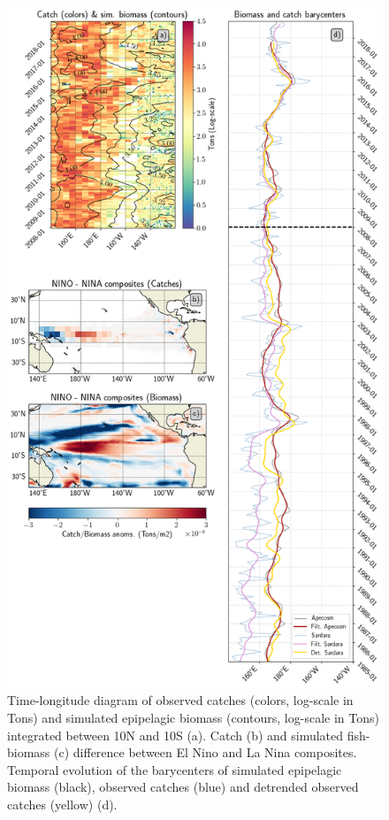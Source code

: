 \begin{figure}[h!tp]
	\centering
	\includegraphics[scale=0.35]{figs/plot_validation_apecosm.png}
	\caption{Time-longitude diagram of observed catches (colors, log-scale in Tons) and simulated epipelagic biomass (contours, log-scale in Tons) integrated between 10N and 10S (a). Catch (b) and simulated fish-biomass (c) difference between El Nino and La Nina composites. Temporal evolution of the barycenters of simulated epipelagic biomass (black), observed catches (blue) and detrended observed catches (yellow) (d).}
	\label{fig:apecosm_validation}
\end{figure}

